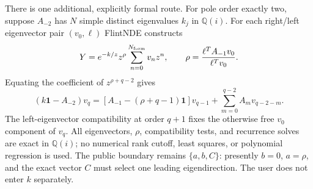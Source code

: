 \documentclass[11pt]{article}
\newcommand{\Id}{\mathbf 1}
\renewcommand{\_}{\origunderscore\allowbreak}
\begin{document}
There is one additional, explicitly formal route.  For pole order exactly two, suppose
$A_{-2}$ has $N$ simple distinct eigenvalues $k_j$ in $\mathbb Q(i)$.  For each right/left
eigenvector pair $(v_0,\ell)$ FlintNDE constructs
\begin{equation}
 Y=e^{-k/z}z^\rho\sum_{n=0}^{N_{\rm form}}v_nz^n,
 \qquad
 \rho=\frac{\ell^T A_{-1}v_0}{\ell^Tv_0}.
 \label{eq:formal-rank-one-ansatz}
\end{equation}
Equating the coefficient of $z^{\rho+q-2}$ gives
\begin{equation}
 (k\Id-A_{-2})v_q=
 \left[A_{-1}-(\rho+q-1)\Id\right]v_{q-1}
 +\sum_{m=0}^{q-2}A_m v_{q-2-m}.
 \label{eq:formal-rank-one-recurrence}
\end{equation}
The left-eigenvector compatibility at order $q+1$ fixes the otherwise free $v_0$ component
of $v_q$.  All eigenvectors, $\rho$, compatibility tests, and recurrence solves are exact in
$\mathbb Q(i)$; no numerical rank cutoff, least squares, or polynomial regression is used.
The public boundary remains $\{a,b,C\}$: presently $b=0$, $a=\rho$, and the exact vector $C$
must select one leading eigendirection.  The user does not enter $k$ separately.
\end{document}
